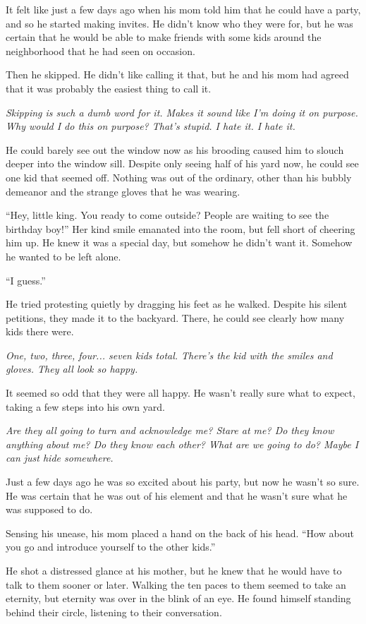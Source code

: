 It felt like just a few days ago when his mom told him that he could have a party, and so he started making invites. He didn't know who they were for, but he was certain that he would be able to make friends with some kids around the neighborhood that he had seen on occasion.

Then he skipped. He didn't like calling it that, but he and his mom had agreed that it was probably the easiest thing to call it.

\textit{Skipping is such a dumb word for it. Makes it sound like I'm doing it on purpose. Why would I do this on purpose? That's stupid. I hate it. I hate it.}

He could barely see out the window now as his brooding caused him to slouch deeper into the window sill. Despite only seeing half of his yard now, he could see one kid that seemed off. Nothing was out of the ordinary, other than his bubbly demeanor and the strange gloves that he was wearing.

``Hey, little king. You ready to come outside? People are waiting to see the birthday boy!'' Her kind smile emanated into the room, but fell short of cheering him up. He knew it was a special day, but somehow he didn't want it. Somehow he wanted to be left alone.

``I guess.''

He tried protesting quietly by dragging his feet as he walked. Despite his silent petitions, they made it to the backyard. There, he could see clearly how many kids there were.

\textit{One, two, three, four... seven kids total. There's the kid with the smiles and gloves. They all look so happy.}

It seemed so odd that they were all happy. He wasn't really sure what to expect, taking a few steps into his own yard.

\textit{Are they all going to turn and acknowledge me? Stare at me? Do they know anything about me? Do they know each other? What are we going to do? Maybe I can just hide somewhere.}

Just a few days ago he was so excited about his party, but now he wasn't so sure. He was certain that he was out of his element and that he wasn't sure what he was supposed to do.

Sensing his unease, his mom placed a hand on the back of his head. ``How about you go and introduce yourself to the other kids.''

He shot a distressed glance at his mother, but he knew that he would have to talk to them sooner or later. Walking the ten paces to them seemed to take an eternity, but eternity was over in the blink of an eye. He found himself standing behind their circle, listening to their conversation.


